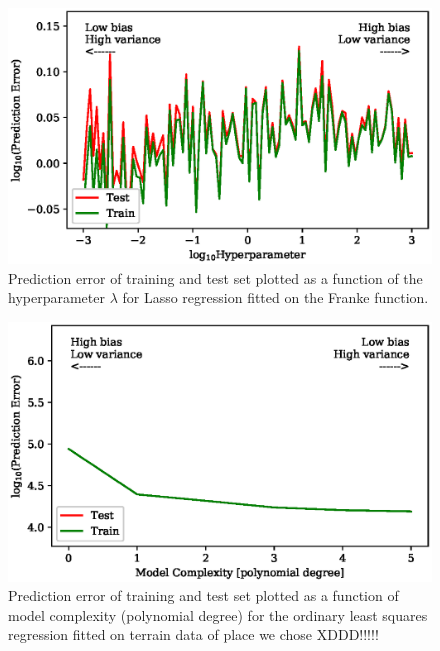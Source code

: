 \documentclass[a4paper, 10pt]{article}
\begin{document}
\begin{figure}[H]
    \includegraphics{figs/biasvariancetradeoff_LASSO_Franke.eps}
    \caption{Prediction error of training and test set plotted as a function of the hyperparameter $\lambda$ for Lasso regression fitted on the Franke function.}
    \label{fig:bias_lasso_Franke}
\end{figure} 

\begin{figure}[H]
    \includegraphics[scale=1]{figs/biasvariancetradeoff_ols_terrain.eps}
    \caption{Prediction error of training and test set plotted as a function of model complexity (polynomial degree) for the ordinary least squares regression fitted on terrain data of place we chose XDDD!!!!!}
    \label{fig:bias_ols_terrain}
\end{figure}
    
\end{document}
